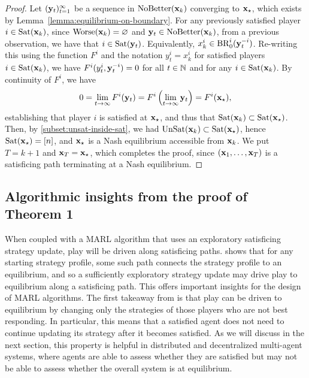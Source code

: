 \begin{proof}
Let $({\mathbf{y}}_t )_{t = 1}^{\infty}$ be a sequence in ${\rm NoBetter}({\mathbf{x}}_k)$ converging to ${\mathbf{x}}_{\star}$, which exists by Lemma~\ref{lemma:equilibrium-on-boundary}. For any previously satisfied player $i \in {\rm Sat}({\mathbf{x}}_k)$, since ${\rm Worse}({\mathbf{x}}_k) = \varnothing$ and ${\mathbf{y}}_t \in {\rm NoBetter}({\mathbf{x}}_k)$, from a previous observation, we have that $i \in {\rm Sat}({\mathbf{y}}_t)$. Equivalently, $x^i_k \in {\rm BR}^i_0 ( {\mathbf{y}}^{-i}_t )$. Re-writing this using the function $F^i$ and the notation $y^i_t = x^i_k$ for satisfied players $i \in {\rm Sat}({\mathbf{x}}_k)$, we have $F^i ( y^i_t , {\mathbf{y}}^{-i}_t ) = 0 $ for all $t \in \mathbb{N} $ and for any $i \in {\rm Sat}({\mathbf{x}}_k)$. By continuity of $F^i$, we have
\[
0 = \lim_{t \to \infty} F^i ( {\mathbf{y}}_t ) = F^i \left( \lim_{t \to \infty} {\mathbf{y}}_t \right) = F^i ( {\mathbf{x}}_{\star}) ,
\]
establishing that player $i$ is satisfied at ${\mathbf{x}}_{\star}$, and thus that ${\rm Sat}({\mathbf{x}}_k) \subset {\rm Sat}({\mathbf{x}}_{\star})$. Then, by \eqref{subset:unsat-inside-sat}, we had ${\rm UnSat}({\mathbf{x}}_k) \subset {\rm Sat}({\mathbf{x}}_{\star})$, hence ${\rm Sat}({\mathbf{x}}_{\star}) = [n]$, and ${\mathbf{x}}_{\star}$ is a Nash equilibrium accessible from ${\mathbf{x}}_k$.  We put $T = k+1$ and ${\mathbf{x}}_{T} = {\mathbf{x}}_{\star}$, which completes the proof, since $({\mathbf{x}}_1, \dots, {\mathbf{x}}_T)$ is a satisficing path terminating at a Nash equilibrium.  
\end{proof}



\subsection{Algorithmic insights from the proof of Theorem 1}


When coupled with a MARL algorithm that uses an exploratory satisficing strategy update, play will be driven along satisficing paths.  shows that for any starting strategy profile, some such path connects the strategy profile to an equilibrium, and so a sufficiently exploratory strategy update may drive play to equilibrium along a satisficing path. This offers important insights for the design of MARL algorithms. The first takeaway from  is that play can be driven to equilibrium by changing only the strategies of those players who are not best responding. In particular, this means that a satisfied agent does not need to continue updating its strategy after it becomes satisfied. As we will discuss in the next section, this property is helpful in distributed and decentralized multi-agent systems, where agents are able to assess whether they are satisfied but may not be able to assess whether the overall system is at equilibrium. 

